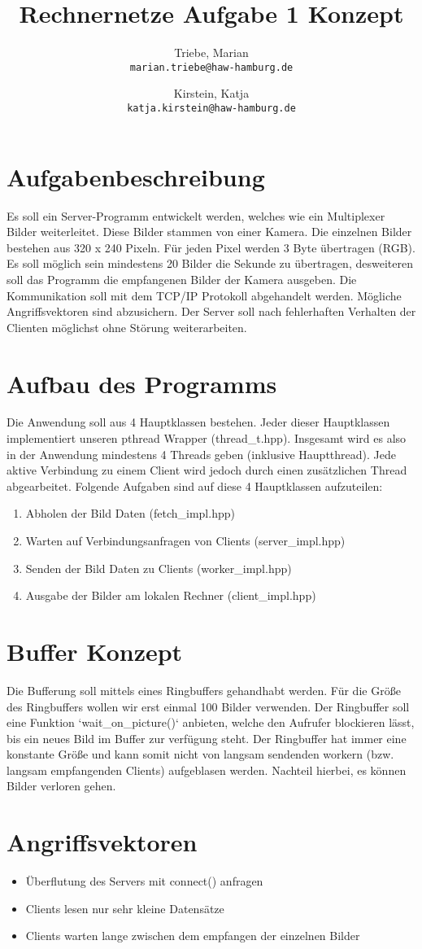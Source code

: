 \documentclass[a4paper,10pt]{article}
\title{Rechnernetze Aufgabe 1 Konzept}
\author{
  Triebe, Marian\\
  \texttt{marian.triebe@haw-hamburg.de}
  \and
  Kirstein, Katja\\
  \texttt{katja.kirstein@haw-hamburg.de}
}
\begin{document}
\maketitle

\section{Aufgabenbeschreibung}

Es soll ein Server-Programm entwickelt werden, welches wie ein Multiplexer Bilder weiterleitet.
Diese Bilder stammen von einer Kamera. Die einzelnen Bilder bestehen aus 320 x 240 Pixeln.
Für jeden Pixel werden 3 Byte übertragen (RGB). Es soll möglich sein mindestens 20 Bilder die Sekunde
zu übertragen, desweiteren soll das Programm die empfangenen Bilder
der Kamera ausgeben. Die Kommunikation soll mit dem TCP/IP Protokoll abgehandelt werden. Mögliche
Angriffsvektoren sind abzusichern. Der Server soll nach fehlerhaften Verhalten der Clienten möglichst
ohne Störung weiterarbeiten.

\section{Aufbau des Programms}

Die Anwendung soll aus 4 Hauptklassen bestehen. Jeder dieser Hauptklassen implementiert unseren pthread Wrapper
(thread\_t.hpp). Insgesamt wird es also in der Anwendung mindestens 4 Threads geben (inklusive Hauptthread).
Jede aktive Verbindung zu einem Client wird jedoch durch einen zusätzlichen Thread abgearbeitet.
Folgende Aufgaben sind auf diese 4 Hauptklassen aufzuteilen:
\begin{enumerate}
 \item Abholen der Bild Daten (fetch\_impl.hpp)
 \item Warten auf Verbindungsanfragen von Clients (server\_impl.hpp)
 \item Senden der Bild Daten zu Clients (worker\_impl.hpp)
 \item Ausgabe der Bilder am lokalen Rechner (client\_impl.hpp)
\end{enumerate}

\section{Buffer Konzept}

Die Bufferung soll mittels eines Ringbuffers gehandhabt werden. Für die Größe des Ringbuffers wollen wir erst einmal
100 Bilder verwenden. Der Ringbuffer soll eine Funktion `wait\_on\_picture()` anbieten, welche den Aufrufer blockieren lässt,
bis ein neues Bild im Buffer zur verfügung steht. Der Ringbuffer hat immer eine konstante Größe und kann somit nicht von
langsam sendenden workern (bzw. langsam empfangenden Clients)  aufgeblasen werden. Nachteil hierbei, es können Bilder verloren gehen.

\section{Angriffsvektoren}

\begin{itemize}
 \item Überflutung des Servers mit connect() anfragen
 \item Clients lesen nur sehr kleine Datensätze
 \item Clients warten lange zwischen dem empfangen der einzelnen Bilder
\end{itemize}
\end{document}
